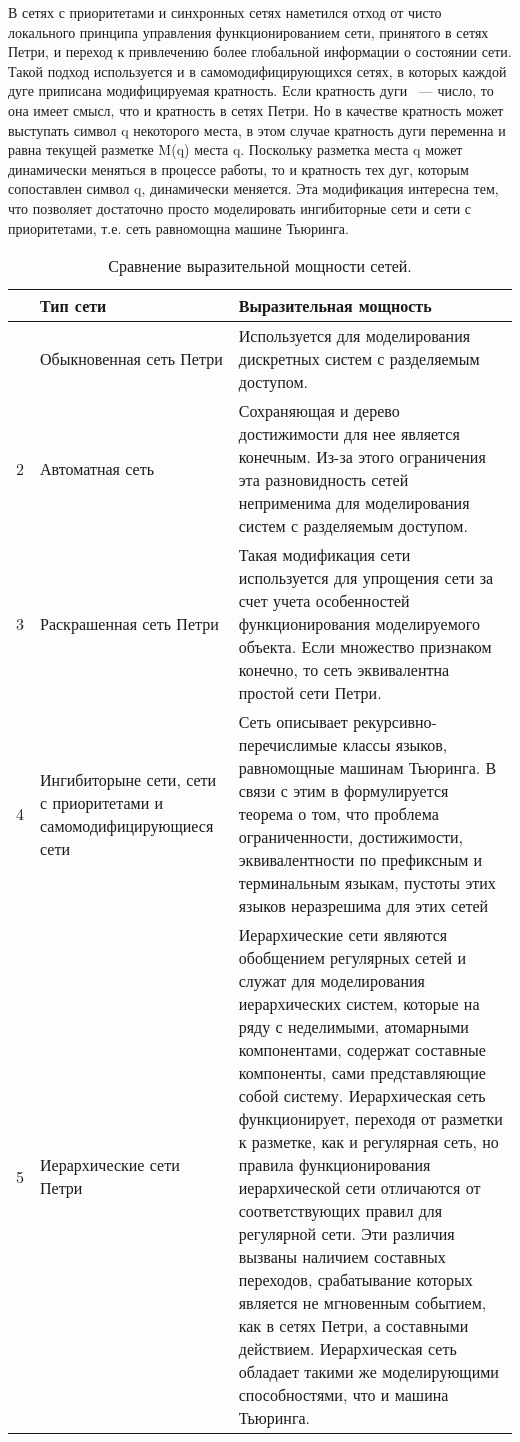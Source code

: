 В сетях с приоритетами и синхронных сетях наметился отход от чисто локального принципа управления функционированием сети, принятого в сетях Петри, и переход к привлечению более глобальной информации о состоянии сети. Такой подход используется и в самомодифицирующихся сетях, в которых каждой дуге приписана модифицируемая кратность. Если кратность дуги ~--- число, то она имеет смысл, что и кратность в сетях Петри. Но в качестве кратность может выступать символ q некоторого места, в этом случае кратность дуги переменна и равна текущей разметке M(q) места q. Поскольку разметка места q может динамически меняться в процессе работы, то и кратность тех дуг, которым сопоставлен символ q, динамически меняется. Эта модификация интересна тем, что позволяет достаточно просто моделировать ингибиторные сети и сети с приоритетами, т.е. сеть равномощна машине Тьюринга.
\begin{center}
	\begin{longtable}{|p{}|p{}|p{}|}
		\caption{Сравнение выразительной мощности сетей.}
		\label{tab:petri}
		\\ \hline
		& Тип сети & Выразительная мощность
		\hline \endfirsthead
		\subcaption{Продолжение таблицы ~\ref{tab:petri}}
		\\ \hline \endhead
		\hline \subcaption{Продолжение на след. стр.}
		\endfoot
		\hline \endlastfoot
		1 & Обыкновенная сеть Петри & Используется для моделирования дискретных систем с разделяемым доступом. \\
		\hline
		2 & Автоматная сеть & Сохраняющая и дерево достижимости для нее является конечным. Из-за этого ограничения эта разновидность сетей неприменима для моделирования систем с разделяемым доступом. \\
		\hline
		3 & Раскрашенная сеть Петри & Такая модификация сети используется для упрощения сети за счет учета особенностей функционирования моделируемого объекта. Если множество признаком конечно, то сеть эквивалентна простой сети Петри. \\
		\hline
		4 & Ингибиторыне сети, сети с приоритетами и самомодифицирующиеся сети & Сеть описывает рекурсивно-перечислимые классы языков, равномощные машинам Тьюринга. В связи с этим в \cite{Piterson} формулируется теорема о том, что проблема ограниченности, достижимости, эквивалентности по префиксным и терминальным языкам, пустоты этих языков неразрешима для этих сетей \\
		\hline
		5 & Иерархические сети Петри & Иерархические сети являются обобщением регулярных сетей и служат для моделирования иерархических систем, которые на ряду с неделимыми, атомарными компонентами, содержат составные компоненты, сами представляющие собой систему. Иерархическая сеть функционирует, переходя от разметки к разметке, как и регулярная сеть, но правила функционирования иерархической сети отличаются от соответствующих правил для регулярной сети. Эти различия вызваны наличием составных переходов, срабатывание которых является не мгновенным событием, как в сетях Петри, а составными действием. \cite{Kotov} Иерархическая сеть обладает такими же моделирующими способностями, что и машина Тьюринга. \\

\end{longtable}
\end{center}
